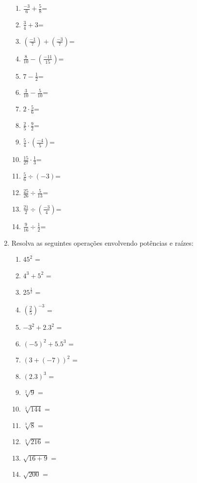 \begin{enumerate}
\begin{multicols}{2}
 \begin{enumerate}
  \item $\frac{-3}{6} + \frac{5}{8}$=
 \item $\frac{3}{4} + 3$=
 \item $\left(\frac{-1}{7}\right) + \left(\frac{-3}{7}\right)$=
 \item $\frac{8}{10} - \left(\frac{-11}{15}\right)$=
 \item $7 - \frac{1}{2}$=
 \item $\frac{3}{10} - \frac{5}{10}$=
 \item $2 \cdot \frac{5}{6}$=
 \item $\frac{2}{5} \cdot \frac{9}{2}$=
 \item $\frac{5}{4} \cdot \left(\frac{-4}{5}\right)$=
 \item $\frac{15}{27} \cdot \frac{1}{3}$=
 \item $\frac{5}{6} \div (-3)$=
 \item $\frac{25}{26} \div \frac{5}{13}$=
 \item $\frac{21}{2} \div \left(\frac{-3}{4}\right)$=
 \item $\frac{9}{16} \div \frac{1}{2}$=
\end{enumerate}
\end{multicols}

 \item Resolva as seguintes operações envolvendo potências e raízes:
 
\begin{multicols}{2}
 \begin{enumerate}
 \item $45^2$ =
 \item $4^3 + 5^2$ =
 \item $25^{\frac{1}{2}}$ =
 \item $\left(\frac{2}{5}\right)^{-3}$ =
 \item $-3^2 + 2.3^2$ =
 \item $(-5)^2 + 5.5^3$ =
 \item $(3+(-7))^2$ =
 \item $(2.3)^3$ =
 \item $\sqrt[2]{9}$ =
 \item $\sqrt[2]{144}$ =
 \item $\sqrt[3]{8}$ =
 \item $\sqrt[3]{216}$ =
 \item $\sqrt{16+9}$ =
 \item $\sqrt{200}$ =
\end{enumerate}
\end{multicols}

\end{enumerate}

